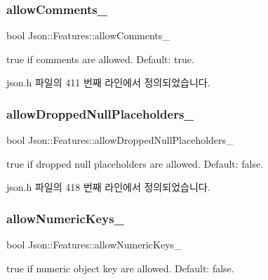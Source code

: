 \subsubsection{\texorpdfstring{allow\+Comments\+\_\+}{allowComments\_}}
{\footnotesize\ttfamily bool Json\+::\+Features\+::allow\+Comments\+\_\+}



{\ttfamily true} if comments are allowed. Default\+: {\ttfamily true}. 



json.\+h 파일의 411 번째 라인에서 정의되었습니다.

\mbox{\label{class_json_1_1_features_a5076aa72c05c7596ac339ede36c97a6a}} 
\subsubsection{\texorpdfstring{allow\+Dropped\+Null\+Placeholders\+\_\+}{allowDroppedNullPlaceholders\_}}
{\footnotesize\ttfamily bool Json\+::\+Features\+::allow\+Dropped\+Null\+Placeholders\+\_\+}



{\ttfamily true} if dropped null placeholders are allowed. Default\+: {\ttfamily false}. 



json.\+h 파일의 418 번째 라인에서 정의되었습니다.

\mbox{\label{class_json_1_1_features_aff3cb16b79d15d3d761b11a0dd6d4d6b}} 
\subsubsection{\texorpdfstring{allow\+Numeric\+Keys\+\_\+}{allowNumericKeys\_}}
{\footnotesize\ttfamily bool Json\+::\+Features\+::allow\+Numeric\+Keys\+\_\+}



{\ttfamily true} if numeric object key are allowed. Default\+: {\ttfamily false}. 



